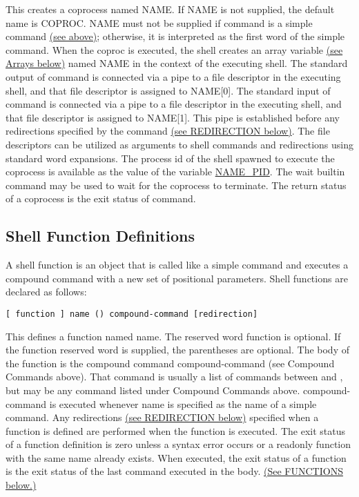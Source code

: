 This creates a coprocess named NAME. If NAME is not supplied, the default name is COPROC. NAME must not be supplied if command is a simple command \hyperref[lst:if]{(see above)}; otherwise, it is interpreted as the first word of the simple command. When the coproc is executed, the shell creates an array variable \hyperref[sec:arrays]{(see Arrays below)} named NAME in the context of the executing shell. The standard output of command is connected via a pipe to a file descriptor in the executing shell, and that file descriptor is assigned to NAME[0]. The standard input of command is connected via a pipe to a file descriptor in the executing shell, and that file descriptor is assigned to NAME[1]. This pipe is established before any redirections specified by the command \hyperref[sec:redirection]{(see REDIRECTION below)}. The file descriptors can be utilized as arguments to shell commands and redirections using standard word expansions. The process id of the shell spawned to execute the coprocess is available as the value of the variable \url{NAME\_PID}. The wait builtin command may be used to wait for the coprocess to terminate.
The return status of a coprocess is the exit status of command.

\subsection{Shell Function Definitions}

A shell function is an object that is called like a simple command and executes a compound command with a new set of positional parameters. Shell functions are declared as follows:
\begin{lstlisting}
[ function ] name () compound-command [redirection]
\end{lstlisting}

This defines a function named name. The reserved word function is optional. If the function reserved word is supplied, the parentheses are optional. The body of the function is the compound command compound-command (see Compound Commands above). That command is usually a list of commands between { and }, but may be any command listed under Compound Commands above. compound-command is executed whenever name is specified as the name of a simple command. Any redirections \hyperref[sec:redirection]{(see REDIRECTION below)} specified when a function is defined are performed when the function is executed. The exit status of a function definition is zero unless a syntax error occurs or a readonly function with the same name already exists. When executed, the exit status of a function is the exit status of the last command executed in the body. \hyperref[sec:functions]{(See FUNCTIONS below.)}